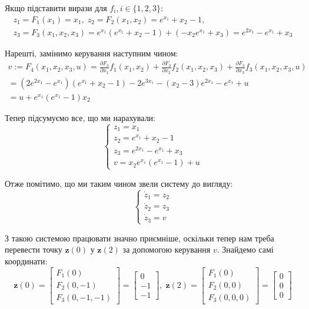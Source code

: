 \documentclass[oneside,solution]{karazin-control-assign}
\begin{document}
Якщо підставити вирази для $f_i, i \in \{1,2,3\}$:
\begin{gather}
    z_1 = F_1(x_1) = x_1, \; z_2 = F_2(x_1,x_2) = e^{x_1}+x_2-1, \nonumber \\ z_3 = F_3(x_1,x_2,x_3) =  e^{x_1}(e^{x_1}+x_2-1) + (-x_2e^{x_1} + x_3) = e^{2x_1} - e^{x_1} + x_3
\end{gather}

Нарешті, замінимо керування наступним чином:
\begin{gather}
    v := F_4(x_1,x_2,x_3,u) = \frac{\partial F_3}{\partial x_1}f_1(x_1,x_2) + \frac{\partial F_3}{\partial x_2}f_2(x_1,x_2,x_3) + \frac{\partial F_3}{\partial x_3}f_3(x_1,x_2,x_3,u) \nonumber\\
    = (2e^{2x_1} - e^{x_1})(e^{x_1}+x_2-1) - 2e^{3x_1} - (x_2 - 3)e^{2x_1} - e^{x_1} + u \nonumber \\
    = u + e^{x_1}(e^{x_1}-1)x_2
\end{gather}

Тепер підсумуємо все, що ми нарахували:
\begin{equation}\label{zam}
    \begin{cases}
        z_1 = x_1 \\
        z_2 = e^{x_1} + x_2 - 1 \\
        z_3 = e^{2x_1} - e^{x_1} + x_3 \\
        v = x_2e^{x_1}(e^{x_1}-1) + u
    \end{cases}
\end{equation}

Отже помітимо, що ми таким чином звели систему до вигляду:
\begin{equation}\label{eq:1}
    \begin{cases}
        \dot{z}_1 = z_2 \\
        \dot{z}_2 = z_3 \\
        \dot{z}_3 = v
    \end{cases}
\end{equation}

З такою системою працювати значно приємніше, оскільки тепер нам треба перевести точку $\mathbf{z}(0)$ у $\mathbf{z}(2)$ за допомогою керування $v$. Знайдемо самі координати:
\begin{equation}
    \mathbf{z}(0) = \begin{bmatrix}
        F_1(0) \\
        F_2(0,-1) \\
        F_3(0,-1,-1)
    \end{bmatrix} = \begin{bmatrix}
        0 \\ -1 \\ -1
    \end{bmatrix}, \; \mathbf{z}(2) = \begin{bmatrix}
        F_1(0) \\
        F_2(0,0) \\
        F_3(0,0,0)
    \end{bmatrix} = \begin{bmatrix}
        0 \\ 0 \\ 0
    \end{bmatrix}
\end{equation}
\end{document}
